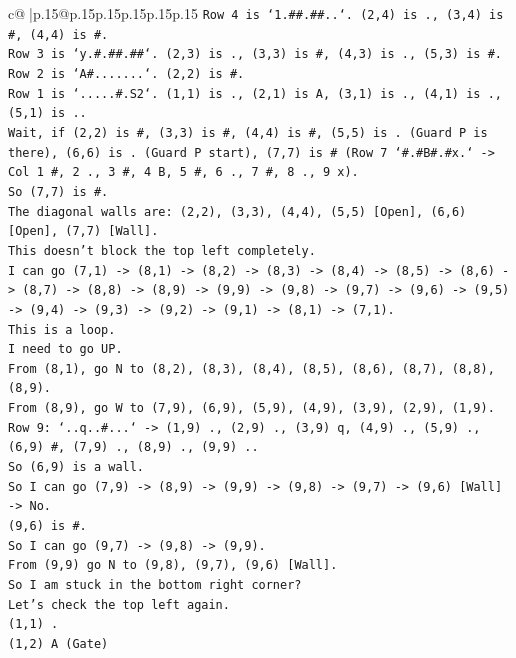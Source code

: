 \documentclass{article}
\begin{document}
{\begin{supertabular}{c@{$\;$}|p{.15\linewidth}@{}p{.15\linewidth}p{.15\linewidth}p{.15\linewidth}p{.15\linewidth}p{.15\linewidth}}
{{{\texttt{Row 4 is `1.\#\#.\#\#..`. (2,4) is ., (3,4) is \#, (4,4) is \#.} \\
\texttt{Row 3 is `y.\#.\#\#.\#\#`. (2,3) is ., (3,3) is \#, (4,3) is ., (5,3) is \#.} \\
\texttt{Row 2 is `A\#.......`. (2,2) is \#.} \\
\texttt{Row 1 is `.....\#.S2`. (1,1) is ., (2,1) is A, (3,1) is ., (4,1) is ., (5,1) is ..} \\
\texttt{Wait, if (2,2) is \#, (3,3) is \#, (4,4) is \#, (5,5) is . (Guard P is there), (6,6) is . (Guard P start), (7,7) is \# (Row 7 `\#.\#B\#.\#x.` {-}> Col 1 \#, 2 ., 3 \#, 4 B, 5 \#, 6 ., 7 \#, 8 ., 9 x).} \\
\texttt{So (7,7) is \#.} \\
\texttt{The diagonal walls are: (2,2), (3,3), (4,4), (5,5) {[}Open{]}, (6,6) {[}Open{]}, (7,7) {[}Wall{]}.} \\
\texttt{This doesn't block the top left completely.} \\
\texttt{I can go (7,1) {-}> (8,1) {-}> (8,2) {-}> (8,3) {-}> (8,4) {-}> (8,5) {-}> (8,6) {-}> (8,7) {-}> (8,8) {-}> (8,9) {-}> (9,9) {-}> (9,8) {-}> (9,7) {-}> (9,6) {-}> (9,5) {-}> (9,4) {-}> (9,3) {-}> (9,2) {-}> (9,1) {-}> (8,1) {-}> (7,1).} \\
\texttt{This is a loop.} \\
\texttt{I need to go UP.} \\
\texttt{From (8,1), go N to (8,2), (8,3), (8,4), (8,5), (8,6), (8,7), (8,8), (8,9).} \\
\texttt{From (8,9), go W to (7,9), (6,9), (5,9), (4,9), (3,9), (2,9), (1,9).} \\
\texttt{Row 9: `..q..\#...` {-}> (1,9) ., (2,9) ., (3,9) q, (4,9) ., (5,9) ., (6,9) \#, (7,9) ., (8,9) ., (9,9) ..} \\
\texttt{So (6,9) is a wall.} \\
\texttt{So I can go (7,9) {-}> (8,9) {-}> (9,9) {-}> (9,8) {-}> (9,7) {-}> (9,6) {[}Wall{]} {-}> No.} \\
\texttt{(9,6) is \#.} \\
\texttt{So I can go (9,7) {-}> (9,8) {-}> (9,9).} \\
\texttt{From (9,9) go N to (9,8), (9,7), (9,6) {[}Wall{]}.} \\
\texttt{So I am stuck in the bottom right corner?} \\
\texttt{Let's check the top left again.} \\
\texttt{(1,1) .} \\
\texttt{(1,2) A (Gate)} \\
}}}
\end{supertabular}}
\end{document}
